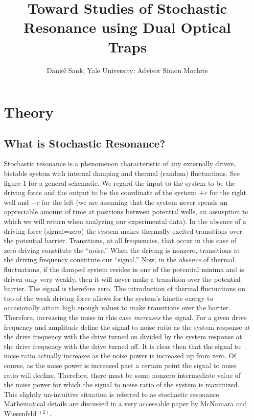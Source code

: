 \documentclass{report}
\title{Toward Studies of Stochastic Resonance using Dual Optical Traps}
\author{Daniel Sank, Yale University: Advisor Simon Mochrie}
\begin{document}
\maketitle
\tableofcontents

\chapter{Theory}

\section{What is Stochastic Resonance?}

Stochastic resonance is a phenomenon characteristic of any externally driven, bistable system with internal damping and thermal (random) fluctuations. See figure 1 for a general schematic. We regard the input to the system to be the driving force and the output to be the coordinate of the system: $+c$ for the right well and $-c$ for the left (we are assuming that the system never spends an appreciable amount of time at positions between potential wells, an assusption to which we will return when analyzing our experimental data). In the absence of a driving force (signal=zero) the system makes thermally excited transitions over the potential barrier. Transitions, at all frequencies, that occur in this case of zero driving constitute the ``noise.'' When the driving is nonzero, transitions at the driving frequency constitute our ``signal.'' Now, in the \emph{absence} of thermal fluctuations, if the damped system resides in one of the potential minima and is driven only very weakly, then it will never make a transition over the potential barrier. The signal is therefore zero. The introduction of thermal fluctuations on top of the weak driving force allows for the system's kinetic energy to occasionally attain high enough values to make transitions over the barrier. Therefore, increasing the noise in this case \emph{increases} the signal. For a given drive frequency and amplitude define the signal to noise ratio as the system response at the drive frequency with the drive turned on divided by the system response at the drive frequency with the drive turned off. It is clear then that the signal to noise ratio actually increases as the noise power is increased up from zero. Of course, as the noise power is increased past a certain point the signal to noise ratio will decline. Therefore, there must be some nonzero intermediate value of the noise power for which the signal to noise ratio of the system is maximized. This slightly un-intuitive situation is referred to as stochastic resonance. Mathematical details are discussed in a very accessable paper by McNamara and Wiesenfeld $^{(2)}$.
\end{document}

